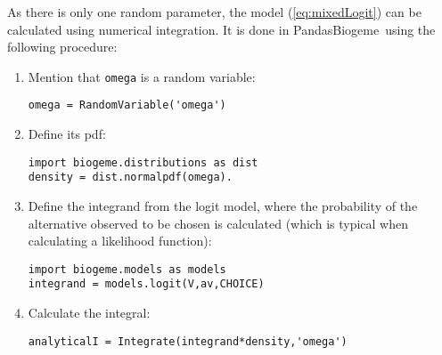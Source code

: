 \documentclass[12pt,a4paper]{article}
\newcommand{\req}[1]{(\ref{#1})}
\newcommand{\PBIOGEME}{PandasBiogeme}
\begin{document}
As there is only one random parameter, the model \req{eq:mixedLogit}
can be calculated using numerical integration. It is done in
\PBIOGEME\ using the following procedure:
\begin{enumerate}
\item Mention that \lstinline$omega$ is a random variable:
\begin{lstlisting}
omega = RandomVariable('omega')
\end{lstlisting}
\item Define its pdf:
\begin{lstlisting}
import biogeme.distributions as dist
density = dist.normalpdf(omega).
\end{lstlisting}
\item Define the integrand from the logit model, where the probability
  of the alternative observed to be chosen is calculated (which is
  typical when calculating a likelihood function):
\begin{lstlisting}
import biogeme.models as models
integrand = models.logit(V,av,CHOICE)
\end{lstlisting}
\item Calculate the integral:
\begin{lstlisting}
analyticalI = Integrate(integrand*density,'omega')
\end{lstlisting}
\end{enumerate}
\end{document}
